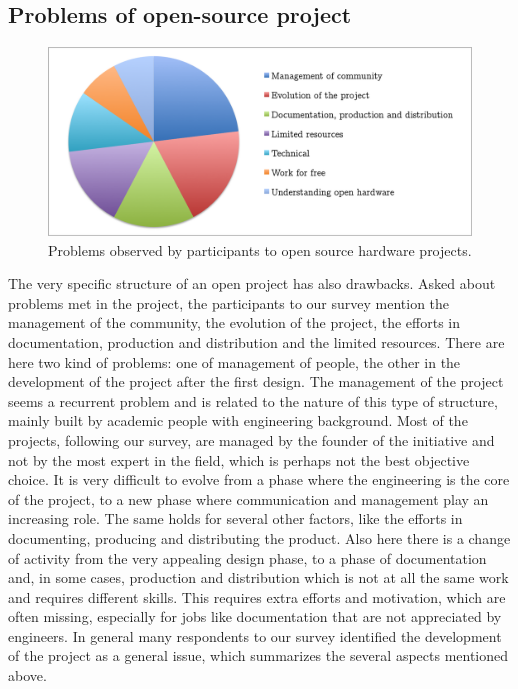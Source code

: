 \documentclass[letterpaper, 10 pt, conference]{ieeeconf}  %
\begin{document}
\subsection{Problems of open-source project}

\begin{figure}
\centering
\includegraphics[width=\columnwidth]{figures/problems}
\caption{Problems observed by participants to open source hardware projects.}
\label{fig:problems}
\end{figure}

The very specific structure of an open project has also drawbacks. 
Asked about problems met in the project, the participants to our survey mention the management of the community, the evolution of the project, the efforts in documentation, production and distribution and the limited resources.
There are here two kind of problems: one of management of people, the other in the development of the project after the first design.
The management of the project seems a recurrent problem and is related to the nature of this type of structure, mainly built by academic people with engineering background. 
Most of the projects, following our survey, are managed by the founder of the initiative and not by the most expert in the field, which is perhaps not the best objective choice.
It is very difficult to evolve from a phase where the engineering is the core of the project, to a new phase where communication and management play an increasing role.
The same holds for several other factors, like the efforts in documenting, producing and distributing the product. 
Also here there is a change of activity from the very appealing design phase, to a phase of documentation and, in some cases, production and distribution which is not at all the same work and requires different skills.
This requires extra efforts and motivation, which are often missing, especially for jobs like documentation that are not appreciated by engineers.
In general many respondents to our survey identified the development of the project as a general issue, which summarizes the several aspects mentioned above.
\end{document}

